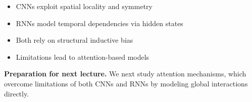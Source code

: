 \begin{itemize}
    \item CNNs exploit spatial locality and symmetry
    \item RNNs model temporal dependencies via hidden states
    \item Both rely on structural inductive bias
    \item Limitations lead to attention-based models
\end{itemize}

\medskip

\noindent
\textbf{Preparation for next lecture.}  
We next study attention mechanisms, which overcome limitations of both CNNs and RNNs by modeling global interactions directly.